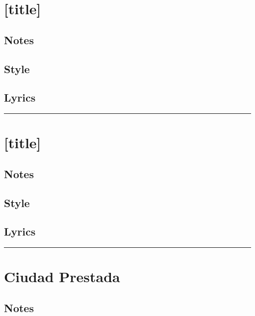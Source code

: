 \section{{[}title{]}}\label{title}

\subsection{Notes}\label{notes-35}

\subsection{Style}\label{style-34}

\subsection{Lyrics}\label{lyrics-34}

\begin{center}\rule{0.5\linewidth}{0.5pt}\end{center}

\section{{[}title{]}}\label{title-1}

\subsection{Notes}\label{notes-36}

\subsection{Style}\label{style-35}

\subsection{Lyrics}\label{lyrics-35}

\begin{center}\rule{0.5\linewidth}{0.5pt}\end{center}

\section{Ciudad Prestada}\label{ciudad-prestada}

\subsection{Notes}\label{notes-37}

